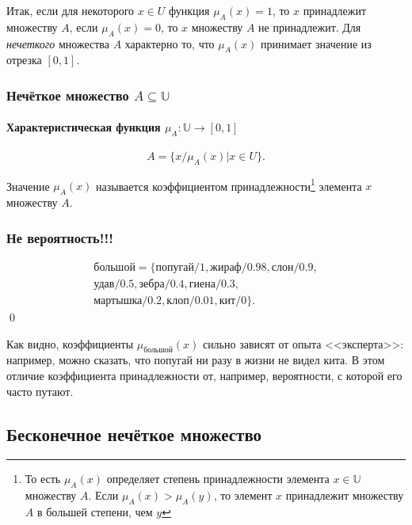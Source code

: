 Итак, если для некоторого $x\in U$ функция $\mu_A(x)=1$, то $x$ принадлежит множеству $A$, если $\mu_A(x)=0$, то $x$ множеству $A$ не принадлежит. Для \emph{нечеткого} множества $A$ характерно то, что $\mu_A(x)$ принимает значение из отрезка $[0,1]$. 

\begin{frame}
    \frametitle{Нечёткое множество $A\subseteq\mathbb{U}$}
    \framesubtitle{Характеристическая функция $\mu_A:\mathbb{U}\to[0,1]$}
    
    \[
        A=\{x/\mu_A(x)|x\in U\}.
    \]
    
    \begin{definition}
        Значение $\mu_A(x)$ называется \alert{коэффициентом принадлежности}\footnote{То есть $\mu_A(x)$ определяет \alert{степень} принадлежности элемента $x\in\mathbb{U}$ множеству $A$. Если $\mu_A(x)>\mu_A(y)$, то элемент $x$ принадлежит множеству $A$ в большей степени, чем $y$} элемента $x$ множеству $A$.
    \end{definition}
\end{frame}




\begin{frame}
    \frametitle{Не вероятность!!!}
    
    \begin{example} 
        \[
            \begin{split}
                \text{большой}=\{
                    \text{попугай}/1,\text{жираф}/0.98,\text{слон}/0.9,\\
                    \text{удав}/0.5,\text{зебра}/0.4,\text{гиена}/0.3,\\
                    \text{мартышка}/0.2,\text{клоп}/0.01,\text{кит}/0\}.
            \end{split}
        \]
        \qed
    \end{example}
    Как видно, коэффициенты $\mu_{\text{большой}}(x)$ сильно зависят от опыта <<эксперта>>: например, можно сказать, что попугай ни разу в жизни не видел кита. В этом отличие коэффициента принадлежности от, например, вероятности, с которой его часто путают.
\end{frame}


\subsection{Бесконечное нечёткое множество}

